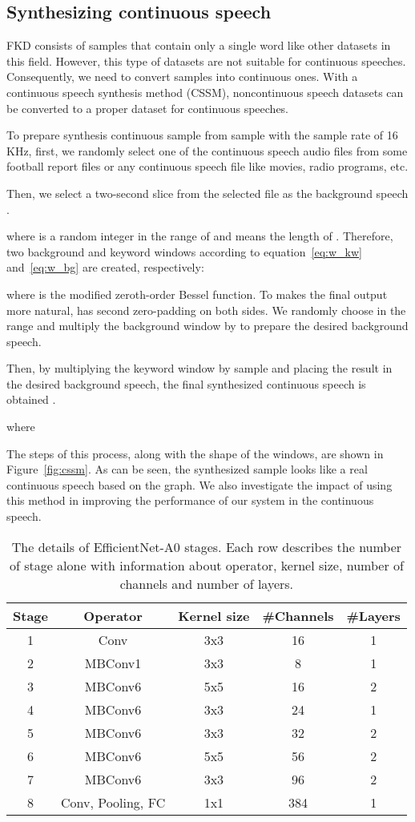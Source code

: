 \documentclass{article}
\begin{document}
 \subsection{Synthesizing continuous speech}
 FKD consists of samples that contain only a single word like other datasets in this field. However, this type of datasets are not suitable for continuous speeches. Consequently, we need to convert samples into continuous ones. With a continuous speech synthesis method (CSSM), noncontinuous speech datasets can be converted to a proper dataset for continuous speeches.

To prepare synthesis continuous sample from  sample  with the sample rate of 16 KHz, first, we randomly select one of the continuous speech audio files  from some football report files or any continuous speech file like movies, radio programs, etc.

Then, we select a two-second slice from the selected file as the background speech .

where  is a random integer in the range of  and  means the length of . Therefore, two background and keyword windows according to equation~\ref{eq:w_kw} and~\ref{eq:w_bg} are created, respectively:


where  is the modified zeroth-order Bessel function. To makes the final output more natural,  has  second zero-padding on both sides.
We randomly choose  in the range  and multiply the background window by  to prepare the desired background speech.

Then, by multiplying the keyword window by sample and placing the result in the desired background speech, the final synthesized continuous speech is obtained .

where

 The steps of this process, along with the shape of the windows, are shown in Figure~\ref{fig:cssm}. As can be seen, the synthesized sample looks like a real continuous speech based on the graph. We also investigate the impact of using this method in improving the performance of our system in the continuous speech.

\begin{table}[h]\centering
\caption{The details of EfficientNet-A0 stages. Each row describes the number of stage alone with information about operator, kernel size, number of channels and number of layers.}

\label{tbl:effa0}
\begin{tabular}{c|cccc}
\hline
Stage  & Operator & Kernel size & \#Channels & \#Layers \\
\hline
1 & Conv & 3x3 & 16 & 1\\
2 & MBConv1 & 3x3 & 8 & 1\\
3 & MBConv6 & 5x5 & 16 & 2\\
4 & MBConv6 & 3x3 & 24 & 1\\
5 & MBConv6 & 3x3 & 32 & 2\\
6 & MBConv6 & 5x5 & 56 & 2\\
7 & MBConv6 & 3x3 & 96 & 2\\
8 & Conv, Pooling, FC & 1x1 & 384 & 1\\
\hline
\end{tabular}
\end{table}
\end{document}
